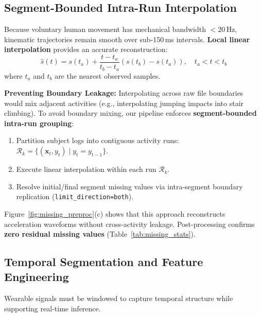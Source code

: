 \documentclass[10pt,twocolumn]{article}
\begin{document}
\subsection{Segment-Bounded Intra-Run Interpolation}
Because voluntary human movement has mechanical bandwidth $<20\,\text{Hz}$, kinematic trajectories remain smooth over sub-150\,ms intervals. \textbf{Local linear interpolation} provides an accurate reconstruction:
\begin{equation}
    \hat{s}(t) = s(t_a) + \frac{t - t_a}{t_b - t_a}\left(s(t_b) - s(t_a)\right), \quad t_a < t < t_b
\end{equation}
where $t_a$ and $t_b$ are the nearest observed samples.

\textbf{Preventing Boundary Leakage:} Interpolating across raw file boundaries would mix adjacent activities (e.g., interpolating jumping impacts into stair climbing). To avoid boundary mixing, our pipeline enforces \textbf{segment-bounded intra-run grouping}:
\begin{enumerate}
    \item Partition subject logs into contiguous activity runs: $\mathcal{R}_k = \{(\mathbf{x}_t, y_t) \mid y_t = y_{t-1}\}$.
    \item Execute linear interpolation within each run $\mathcal{R}_k$.
    \item Resolve initial/final segment missing values via intra-segment boundary replication (\texttt{limit\_direction=both}).
\end{enumerate}
Figure~\ref{fig:missing_preproc}(c) shows that this approach reconstructs acceleration waveforms without cross-activity leakage. Post-processing confirms \textbf{zero residual missing values} (Table~\ref{tab:missing_stats}).

\subsection{Temporal Segmentation and Feature Engineering}
Wearable signals must be windowed to capture temporal structure while supporting real-time inference.
\end{document}
